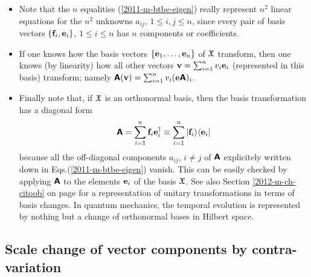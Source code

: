 \begin{itemize}
\item
Note   that the $n$ equalities (\ref {2011-m-btbe-eigen})
really represent $n^2$ linear equations for the $n^2$
unknowns $a_{ij}$, $1\le i,j\le n$, since every pair of basis vectors
$\{{\bf f}_i,{\bf e}_i\}$, $1\le i\le n$ has $n$ components or coefficients.

\item
If one knows how the basis vectors
$
\{
{\bf e}_1,
\ldots ,
{\bf e}_n
\}$ of ${\frak X}$    transform, then one knows (by linearity) how
all other vectors
${\bf v}=
\sum_{i=1}^n v_i{\bf e}_i
$
(represented in this basis) transform; namely
$\textsf{\textbf{A}}({\bf v})=
\sum_{i=1}^n v_i ({\bf e}\textsf{\textbf{A}})_i
$.

\item
Finally note that, if  ${\frak X}$ is an orthonormal basis,
then the basis transformation has a diagonal form
\begin{equation}
\textsf{\textbf{A}} =   \sum_{i=1}^n  {\bf f}_i {\bf e}_i^\dagger
\equiv
\sum_{i=1}^n \vert {\bf f}_i \rangle \langle {\bf e}_i \vert
\label{2013-m-ch-fdvs-dftm}
\end{equation}
because all the off-diagonal components $a_{ij}$, $i\neq j$ of $\textsf{\textbf{A}}$
explicitely written down in Eqs.(\ref{2011-m-btbe-eigen}) vanish.
This can be easily checked by applying $\textsf{\textbf{A}}$ to the elements ${\bf e}_i $ of the basis ${\frak X}$.
See also Section
\ref{2012-m-ch-citoob} on page \pageref{2012-m-ch-citoob}
for a representation of unitary transformations in terms of basis changes.
In quantum mechanics, the temporal evolution is represented by nothing but a change of orthonormal bases in Hilbert space.
\end{itemize}


\subsection{Scale change of vector components by contra-variation}




